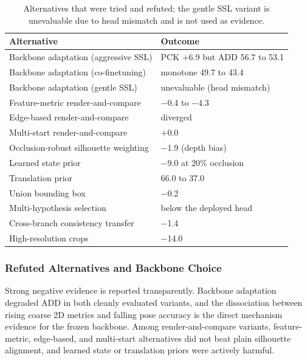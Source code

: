 \begin{table}[t!]
\centering
\renewcommand{\arraystretch}{1.1}
\setlength{\tabcolsep}{4pt}
\begin{tabular}{@{} l l @{}}
\toprule
\textbf{Alternative} & \textbf{Outcome} \\
\midrule
Backbone adaptation (aggressive SSL) & PCK $+$6.9 but ADD 56.7 to 53.1 \\
Backbone adaptation (co-finetuning) & monotone 49.7 to 43.4 \\
Backbone adaptation (gentle SSL) & unevaluable (head mismatch) \\
Feature-metric render-and-compare & $-$0.4 to $-$4.3 \\
Edge-based render-and-compare & diverged \\
Multi-start render-and-compare & $+$0.0 \\
Occlusion-robust silhouette weighting & $-$1.9 (depth bias) \\
Learned state prior & $-$9.0 at 20\% occlusion \\
Translation prior & 66.0 to 37.0 \\
Union bounding box & $-$0.2 \\
Multi-hypothesis selection & below the deployed head \\
Cross-branch consistency transfer & $-$1.4 \\
High-resolution crops & $-$14.0 \\
\bottomrule
\end{tabular}
\caption{Alternatives that were tried and refuted; the gentle SSL variant is unevaluable due to head mismatch and is not used as evidence.}
\label{tab:refuted}
\end{table}

\subsubsection{Refuted Alternatives and Backbone Choice}
Strong negative evidence is reported transparently. Backbone adaptation degraded ADD in both cleanly evaluated variants, and the dissociation between rising coarse 2D metrics and falling pose accuracy is the direct mechanism evidence for the frozen backbone. Among render-and-compare variants, feature-metric, edge-based, and multi-start alternatives did not beat plain silhouette alignment, and learned state or translation priors were actively harmful.

